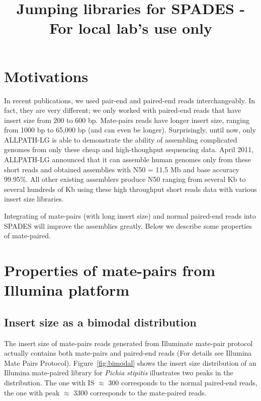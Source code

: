 \documentclass[letterpaper,11pt]{amsart}
\begin{document}
\def\ra#1{\rotatebox{90}{\parbox{1.5in}{#1}}}
\def\mrk#1{{\bf #1}}


\newlength{\commentlength}
\setlength{\commentlength}{1in}
\newcommand{\son}[1]{\marginpar{\colorbox{blue!15!white}{\parbox{\commentlength}{\scriptsize #1}}}}
\newcommand{\glenn}[1]{\marginpar{\colorbox{red!20!white}{\parbox{\commentlength}{\scriptsize #1}}}}
\newcommand{\maxal}[1]{\marginpar{\colorbox{blue!40!white}{\parbox{\commentlength}{\scriptsize #1}}}}
\newcommand{\pavel}[1]{\marginpar{\colorbox{green!40!white}{\parbox{\commentlength}{\scriptsize #1}}}}


\title{Jumping libraries for SPADES - For local lab's use only}
\maketitle
\section{Motivations}
 
In recent publications, we used pair-end  and paired-end reads interchangeably. In fact, they are very different; we only worked with paired-end reads that have insert size from 200 to 600 bp. 
Mate-pairs reads have longer insert size,
ranging from 1000 bp to 65,000 bp (and can even be longer). Surprisingly, until now, only ALLPATH-LG is able to demonstrate the ability of  
assembling complicated genomes from only these cheap and high-thoughput sequencing data. April 2011, ALLPATH-LG announced that it can assemble human genomes only from these short reads and obtained assemblies with
N50 = 11.5 Mb and 
base accuracy 99.95\%. All other 
existing assemblers produce N50 ranging from several Kb to several hundreds of Kb using these high throughput short reads data with various insert size libraries. 

Integrating of mate-pairs (with long insert size) and normal paired-end reads into SPADES will improve the assemblies greatly. Below we describe some properties of mate-paired. 

\section{Properties of mate-pairs from Illumina platform}

\subsection*{Insert size as a bimodal distribution}
The insert size of mate-pairs reads generated from Illuminate mate-pair protocol actually contains both mate-pairs and paired-end reads (For details see Illumina Mate Pairs Protocol).
Figure~\ref{fig:bimodal} shows the insert size distribution of an Illumina mate-paired library for \emph{Pichia stipitis} illustrates two peaks in the distribution.
The one with IS $\approx$ 300 corresponds to the normal paired-end reads,
    the one with peak $\approx$ 3300 corresponds to  the mate-paired  reads.
\end{document}
